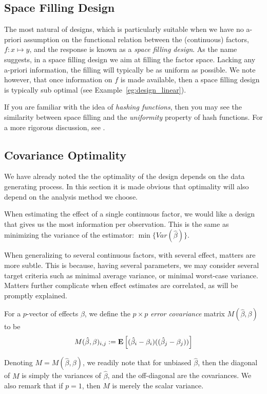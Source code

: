 \subsection{Space Filling Design}
\label{sec:space_filling}
The most natural of designs, which is particularly suitable when we have no a-priori assumption on the functional relation between the (continuous) factors, $f:x \mapsto y$,  and the response is known as a \emph{space filling design}.
As the name suggests, in a space filling design we aim at filling the factor space. Lacking any a-priori information, the filling will typically be as uniform as possible. 
We note however, that once information on $f$ is made available, then a space filling design is typically sub optimal (see Example~\ref{eg:design_linear}).

\begin{extra}
If you are familiar with the idea of \emph{hashing functions}, then you may see the similarity between space filling and the \emph{uniformity} property of hash functions. 
For a more rigorous discussion, see \cite{hill_first_1986}.
\end{extra}



\subsection{Covariance Optimality}
We have already noted the the optimality of the design depends on the data generating process.
In this section it is made obvious that optimality will also depend on the analysis method we choose.

When estimating the effect of a single continuous factor, we would like a design that gives us the most information per observation. This is the same as minimizing the variance of the estimator: $\min \{Var(\hat{\beta})\}$.

When generalizing to several continuous factors, with several effect, matters are more subtle.
This is because, having several parameters, we may consider several target criteria such as
minimal average variance, or minimal worst-case variance.
Matters further complicate when effect estimates are correlated, as will be promptly explained. 


\begin{definition}
For a $p$-vector of effects $\beta$, we define the $p \times p$ \emph{error covariance} matrix $M(\hat{\beta},\beta)$ to be 
\begin{align}
	M(\hat{\beta},\beta)_{i,j}:= \mathbf{E}\left[ (\hat{\beta}_i-\beta_i)((\hat{\beta}_j-\beta_j)) \right]  
\end{align}
\end{definition}
Denoting $M=M(\hat{\beta},\beta)$, we readily note that for unbiased $\hat{\beta}$, then the diagonal of $M$ is simply the variances of $\hat{\beta}$, and the off-diagonal are the covariances. 
We also remark that if $p=1$, then $M$ is merely the scalar variance. 

